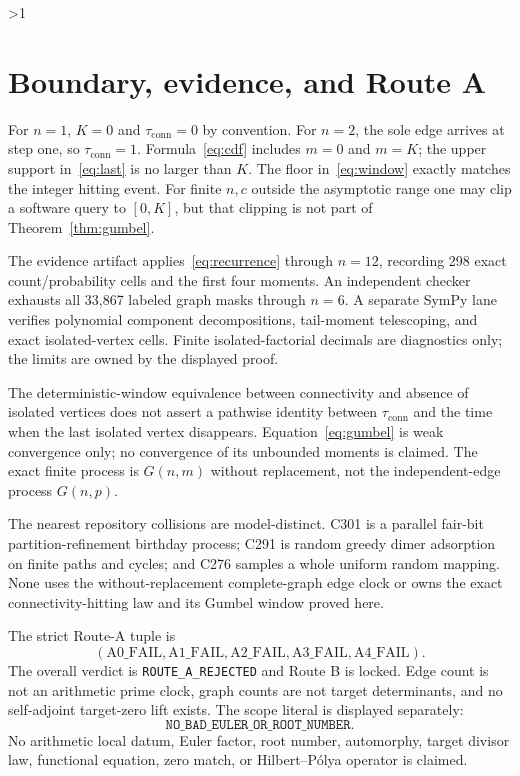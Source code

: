 \documentclass[10pt]{article}
\providecommand{\CRevisionRound}{2}
\newcommand{\conn}{\mathrm{conn}}
\begin{document}
\ifnum\CRevisionRound>1
\section{Boundary, evidence, and Route A}
For $n=1$, $K=0$ and $\tau_{\conn}=0$ by convention.  For $n=2$, the sole
edge arrives at step one, so $\tau_{\conn}=1$.  Formula~\eqref{eq:cdf}
includes $m=0$ and $m=K$; the upper support in~\eqref{eq:last} is no larger
than $K$.  The floor in~\eqref{eq:window} exactly matches the integer hitting
event.  For finite $n,c$ outside the asymptotic range one may clip a software
query to $[0,K]$, but that clipping is not part of Theorem~\ref{thm:gumbel}.

The evidence artifact applies~\eqref{eq:recurrence} through $n=12$, recording
298 exact count/probability cells and the first four moments.  An independent
checker exhausts all 33,867 labeled graph masks through $n=6$.  A separate
SymPy lane verifies polynomial component decompositions, tail-moment
telescoping, and exact isolated-vertex cells.  Finite isolated-factorial
decimals are diagnostics only; the limits are owned by the displayed proof.

The deterministic-window equivalence between connectivity and absence of
isolated vertices does not assert a pathwise identity between
$\tau_{\conn}$ and the time when the last isolated vertex disappears.
Equation~\eqref{eq:gumbel} is weak convergence only; no convergence of its
unbounded moments is claimed.  The exact finite process is $G(n,m)$ without
replacement, not the independent-edge process $G(n,p)$.

The nearest repository collisions are model-distinct.  C301 is a parallel
fair-bit partition-refinement birthday process; C291 is random greedy dimer
adsorption on finite paths and cycles; and C276 samples a whole uniform random
mapping.  None uses the without-replacement complete-graph edge clock or owns
the exact connectivity-hitting law and its Gumbel window proved here.

The strict Route-A tuple is
\[
 (\mathrm{A0\_FAIL},\mathrm{A1\_FAIL},\mathrm{A2\_FAIL},
  \mathrm{A3\_FAIL},\mathrm{A4\_FAIL}).
\]
The overall verdict is \texttt{ROUTE\_A\_REJECTED} and Route B is locked.
Edge count is not an arithmetic prime clock, graph counts are not target
determinants, and no self-adjoint target-zero lift exists.  The scope literal
is displayed separately:
\[
 \texttt{NO\_BAD\_EULER\_OR\_ROOT\_NUMBER}.
\]
No arithmetic local datum, Euler factor, root number, automorphy, target
divisor law, functional equation, zero match, or Hilbert--P\'olya operator is
claimed.
\fi
\end{document}
